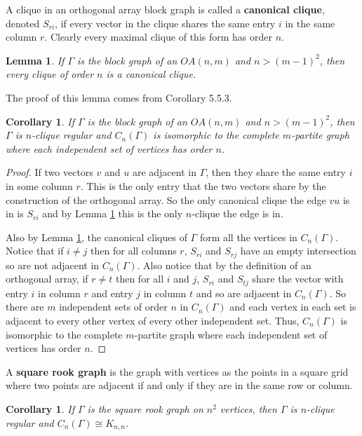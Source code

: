 \documentclass[12pt]{report}
\newtheorem{lem}[thm]{Lemma}
\newtheorem{cor}[thm]{Corollary}
\theoremstyle{definition}
\begin{document}
A clique in an orthogonal array block graph is called a \textbf{canonical clique}, denoted $S_{ri}$, if every vector in the clique shares the same entry $i$ in the same column $r$. Clearly every maximal clique of this form has order $n$.
\begin{lem} \label{lem: OA}
    If $\Gamma$ is the block graph of  an $OA(n,m)$ and $n>(m-1)^2$, then every clique of order $n$ is a canonical clique.
\end{lem}
The proof of this lemma comes from \cite[pg. 99]{godsil} Corollary 5.5.3.
\begin{cor} \label{thm:OA}
    If $\Gamma$ is the block graph of  an $OA(n,m)$ and $n > (m-1)^2$, then $\Gamma$ is $n$-clique regular and $C_n(\Gamma)$ is isomorphic to the complete $m$-partite graph where each independent set of vertices has order $n$.
\end{cor}
\begin{proof}
    If two vectors $v$ and $u$ are adjacent in $\Gamma$, then they share the same entry $i$ in some column $r$. This is the only entry that the two vectors share by the construction of the orthogonal array. So the only canonical clique the edge $vu$ is in is $S_{ri}$ and by Lemma \ref{lem: OA} this is the only $n$-clique the edge is in.\par
    Also by Lemma \ref{lem: OA}, the canonical cliques of $\Gamma$ form all the vertices in $C_n(\Gamma)$. Notice that if $i\neq j$ then for all columns $r$, $S_{ri}$ and $S_{rj}$ have an empty intersection so are not adjacent in $C_n(\Gamma)$. Also notice that by the definition of an orthogonal array, if $r\neq t$ then for all $i$ and $j$, $S_{ri}$ and $S_{tj}$ share the vector with entry $i$ in column $r$ and entry $j$ in column $t$ and so are adjacent in $C_n(\Gamma)$. So there are $m$ independent sets of order $n$ in $C_n(\Gamma)$ and each vertex in each set is adjacent to every other vertex of every other independent set. Thus, $C_n(\Gamma)$ is isomorphic to the complete $m$-partite graph where each independent set of vertices has order $n$.
\end{proof}
A \textbf{square rook graph} is the graph with vertices as the points in a square grid where two points are adjacent if and only if they are in the same row or column.
\begin{cor} \label{thm:rook}
    If $\Gamma$ is the square rook graph on $n^2$ vertices, then $\Gamma$ is $n$-clique regular and $C_n(\Gamma) \cong K_{n,n}$.
\end{cor}
\end{document}

